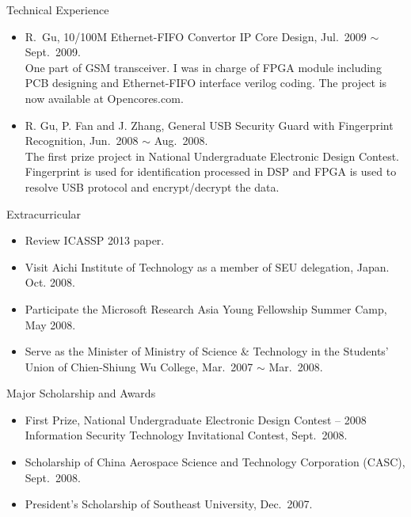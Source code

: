 \documentclass[10pt]{article}
\begin{document}
\begin{cv}
\begin{cvlist}{Technical Experience}
\begin{itemize}
    \item R.~Gu, 10/100M Ethernet-FIFO Convertor IP Core Design, Jul.~2009 
      $\sim$ Sept.~2009.\\
      One part of GSM transceiver. I was in charge of FPGA module including 
      PCB designing and Ethernet-FIFO interface verilog coding. The project 
      is now available at Opencores.com.

    \item R. Gu, P. Fan and J. Zhang, General USB Security Guard with 
      Fingerprint Recognition, Jun.~2008 $\sim$ Aug.~2008.\\
      The first prize project in National Undergraduate Electronic Design 
      Contest. Fingerprint is used for identification processed in DSP and 
      FPGA is used to resolve USB protocol and encrypt/decrypt the data.
  \end{itemize}
\end{cvlist}

\begin{cvlist}{Extracurricular}
\item
\begin{itemize}\itemsep=0.25em
    \item Review ICASSP 2013 paper.
    \item Visit Aichi Institute of Technology as a member of SEU 
      delegation, Japan. Oct. 2008.
    \item Participate the Microsoft Research Asia Young Fellowship Summer 
      Camp, May 2008.
    \item Serve as the Minister of Ministry of Science \& Technology in the 
      Students’ Union of Chien-Shiung Wu College, Mar.~2007 $\sim$ 
      Mar.~2008.
  \end{itemize}
\end{cvlist}

\begin{cvlist}{Major Scholarship and Awards}
\item
\begin{itemize}\itemsep=0.25em
    \item First Prize, National Undergraduate Electronic Design Contest – 
      2008 Information Security Technology Invitational Contest, 
      Sept.~2008.
    \item Scholarship of China Aerospace Science and Technology Corporation 
      (CASC), Sept.~2008.
    \item President’s Scholarship of Southeast University, Dec.~2007.
  \end{itemize}
\end{cvlist}

\setlength{\cvlabelwidth}{\oldcvlabelwidth}
\setlength{\cvlabelsep}{\oldcvlabelsep}
\end{cv}
\end{document}
